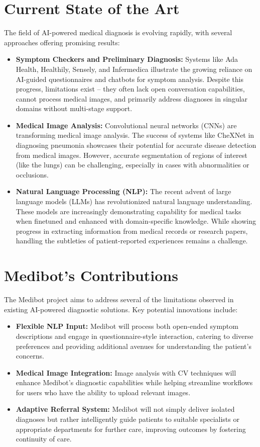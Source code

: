 \section{Current State of the Art}

The field of AI-powered medical diagnosis is evolving rapidly, with several approaches offering promising results:

\begin{itemize}
    \item \textbf{Symptom Checkers and Preliminary Diagnosis: }Systems like Ada Health, Healthily, Sensely,  and Infermedica illustrate the growing reliance on  AI-guided questionnaires and chatbots for symptom analysis.  Despite this progress, limitations exist – they often lack open conversation capabilities, cannot process medical images, and primarily address diagnoses in singular domains without multi-stage support.
    \item \textbf{Medical Image Analysis: } Convolutional neural networks (CNNs) are transforming  medical image analysis.   The success of systems like CheXNet in diagnosing pneumonia showcases their potential for accurate disease detection from medical images.  However, accurate segmentation of regions of interest (like the lungs) can be challenging, especially in cases with abnormalities or occlusions.
    \item \textbf{Natural Language Processing (NLP): }   The recent advent of large language models (LLMs) has revolutionized natural language understanding. These models are increasingly demonstrating capability for medical tasks when finetuned and enhanced with domain-specific knowledge. While showing progress in extracting information from medical records or research papers, handling the subtleties of patient-reported experiences remains a challenge.
\end{itemize}

\section{Medibot's Contributions}
The Medibot project aims to address several of the limitations observed in existing AI-powered diagnostic solutions. Key potential innovations include:

\begin{itemize}
    \item \textbf{Flexible NLP Input: } Medibot will process both open-ended symptom descriptions and engage in questionnaire-style interaction, catering to diverse preferences and providing additional avenues for understanding the patient's concerns.
    \item \textbf{Medical Image Integration: } Image analysis with CV techniques will enhance Medibot's diagnostic capabilities while helping streamline workflows for users who have the ability to upload relevant images.
    \item \textbf{Adaptive Referral System: } Medibot will not simply deliver isolated diagnoses but rather intelligently guide patients to suitable specialists or appropriate departments for further care, improving outcomes by fostering continuity of care.
\end{itemize}

